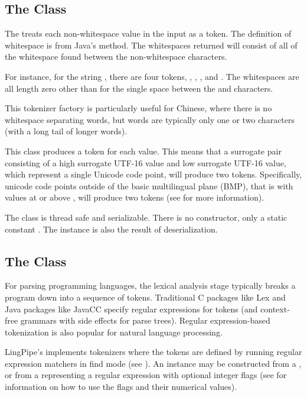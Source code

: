 \subsection{The  Class}

The  treats each non-whitespace
 value in the input as a token.  The definition of
whitespace is from Java's  method.
The whitespaces returned will consist of
all of the whitespace found between the non-whitespace characters.

For instance, for the string , there are four
tokens, , , , and
.  The whitespaces are all length zero other than 
for the single space between the  and 
characters.

This tokenizer factory is particularly useful for Chinese, where there
is no whitespace separating words, but words are typically only one or
two characters (with a long tail of longer words).

This class produces a token for each  value.  This means
that a surrogate pair consisting of a high surrogate UTF-16 value and
low surrogate UTF-16 value, which represent a single Unicode code
point, will produce two tokens.  Specifically, unicode code points
outside of the basic multilingual plane (BMP), that is with values at
or above , will produce two tokens (see  for more
information).

The class is thread safe and serializable.  There is no constructor,
only a static constant .  The instance is also the
result of deserialization.


\subsection{The  Class}

For parsing programming languages, the lexical analysis stage
typically breaks a program down into a sequence of tokens.
Traditional C packages like Lex and Java packages like JavaCC specify
regular expressions for tokens (and context-free grammars with side
effects for parse trees).  Regular expression-based tokenization is
also popular for natural language processing.

LingPipe's  implements tokenizers where
the tokens are defined by running regular expression matchers in find
mode (see ).  An instance may be constructed from a
, or from a  representing a regular
expression with optional integer flags (see  for
information on how to use the flags and their numerical values).

